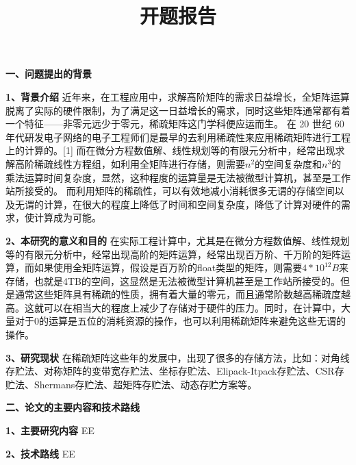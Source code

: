 \documentclass{article}
\begin{document}
  

\title{开题报告}
\date{}

\maketitle


\textbf{一、问题提出的背景}
      \qquad
\newline
    
     \textbf{1、背景介绍}
     \qquad
      近年来，在工程应用中，求解高阶矩阵的需求日益增长，全矩阵运算脱离了实际的硬件限制，为了满足这一日益增长的需求，同时这些矩阵通常都有着一个特征——非零元远少于零元，稀疏矩阵这门学科便应运而生。
在 20 世纪 60 年代研发电子网络的电子工程师们是最早的去利用稀疏性来应用稀疏矩阵进行工程上的计算的。[1]
而在微分方程数值解、线性规划等的有限元分析中，经常出现求解高阶稀疏线性方程组，如利用全矩阵进行存储，则需要$n^2$的空间复杂度和$n^3$的乘法运算时间复杂度，显然，这种程度的运算量是无法被微型计算机，甚至是工作站所接受的。
而利用矩阵的稀疏性，可以有效地减小消耗很多无谓的存储空间以及无谓的计算，在很大的程度上降低了时间和空间复杂度，降低了计算对硬件的需求，使计算成为可能。
\newline

 \textbf{2、本研究的意义和目的}
 \newline
 在实际工程计算中，尤其是在微分方程数值解、线性规划等的有限元分析中，经常出现高阶的矩阵运算，经常出现百万阶、千万阶的矩阵运算，而如果使用全矩阵运算，假设是百万阶的float类型的矩阵，则需要$4*10^{12}B$来存储，也就是4TB的空间，这显然是无法被微型计算机甚至是工作站所接受的。但是通常这些矩阵具有稀疏的性质，拥有着大量的零元，而且通常阶数越高稀疏度越高。这就可以在相当大的程度上减少了存储对于硬件的压力。同时，在计算中，大量对于0的运算是五位的消耗资源的操作，也可以利用稀疏矩阵来避免这些无谓的操作。\newline
 
\textbf{3、研究现状}\newline
在稀疏矩阵这些年的发展中，出现了很多的存储方法，比如：对角线存贮法、对称矩阵的变带宽存贮法、坐标存贮法、Elipack-Itpack存贮法、CSR存贮法、Shermans存贮法、超矩阵存贮法、动态存贮方案等。\newline

\textbf{二、论文的主要内容和技术路线}
      \qquad
\newline

     \textbf{1、主要研究内容}
     EE
\newline


     \textbf{2、技术路线}
     EE
\newline
\end{document}
